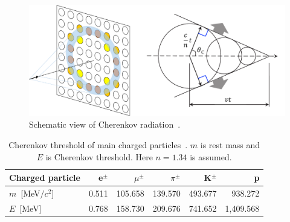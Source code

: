 \begin{figure}[H]
	\centering
	\includegraphics[width=14cm]{Figures/SK/Cherenkov_03}
	\caption[Schematic view of Cherenkov radiation]{
	Schematic view of Cherenkov radiation~\cite{2015Yamamoto}.
	}\label{SK_Cherenkov_03}
\end{figure}

\begin{table}[H]
	\caption[Cherenkov threshold of main charged particles]{
	Cherenkov threshold of main charged particles~\cite{2022Workman}.
	$m$ is rest mass and $E$ is Cherenkov threshold.
	Here $n=1.34$ is assumed.
	}\label{SK_Tab:Che}
	\centering
	\vs
	\begin{tabular}{lrrrrr} \hline\hline
		Charged particle  & e$^{\pm}$ & $\mu^{\pm}$ & $\pi^{\pm}$ & K$^{\pm}$ &p         \\ \hline
		$m$~[MeV$/c^{2}$] & 0.511     & 105.658     & 139.570     & 493.677   &938.272   \\
		$E$~[MeV]         & 0.768     & 158.730     & 209.676     & 741.652   &1,409.568 \\ \hline\hline
	\end{tabular}
\end{table}





